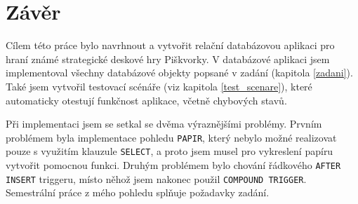 \documentclass[
11pt,
a4paper,
pdftex,
czech,
titlepage
]{report}
\begin{document}
\chapter{Závěr}\label{zaver}
Cílem této práce bylo navrhnout a vytvořit relační databázovou aplikaci pro hraní známé strategické deskové hry Piškvorky. V databázové aplikaci jsem implementoval všechny databázové objekty popsané v zadání (kapitola \ref{zadani}). Také jsem vytvořil testovací scénáře (viz kapitola \ref{test_scenare}), které automaticky otestují funkčnost aplikace, včetně chybových stavů. 

Při implementaci jsem se setkal se dvěma výraznějšími problémy. Prvním problémem byla implementace pohledu \texttt{PAPIR}, který nebylo možné realizovat pouze s využitím klauzule \texttt{SELECT}, a proto jsem musel pro vykreslení papíru vytvořit pomocnou funkci. Druhým problémem bylo chování řádkového \texttt{AFTER INSERT} triggeru, místo něhož jsem nakonec použil \texttt{COMPOUND TRIGGER}.\\

\noindent Semestrální práce z mého pohledu splňuje požadavky zadání.
\end{document}
